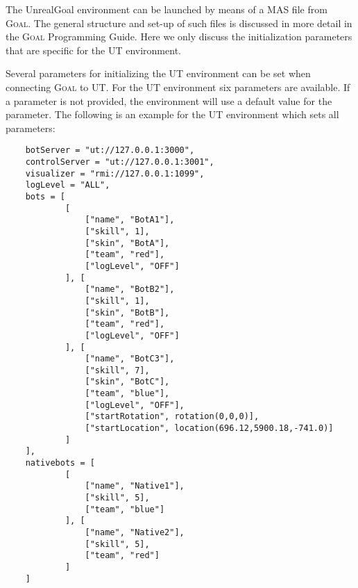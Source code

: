 \documentclass[11pt,a4paper]{article}
\newcommand{\Goal}{\textsc{Goal}}
\begin{document}
The UnrealGoal environment can be launched by means of a MAS file from {\Goal}. The general structure and set-up of such files is discussed in more detail in the {\Goal} Programming Guide. Here we only discuss the initialization parameters that are specific for the UT environment.

Several parameters for initializing the UT environment can be set when connecting {\Goal} to UT. For the UT environment six parameters are available. If a parameter is not provided, the environment will use a default value for the parameter. The following is an example for the UT environment which sets all parameters:

\begin{verbatim}
    botServer = "ut://127.0.0.1:3000",
    controlServer = "ut://127.0.0.1:3001",
    visualizer = "rmi://127.0.0.1:1099",
    logLevel = "ALL", 
    bots = [
            [
                ["name", "BotA1"],
                ["skill", 1],
                ["skin", "BotA"], 
                ["team", "red"],
                ["logLevel", "OFF"]
            ], [
                ["name", "BotB2"],
                ["skill", 1],
                ["skin", "BotB"], 
                ["team", "red"],
                ["logLevel", "OFF"]
            ], [
                ["name", "BotC3"],
                ["skill", 7],
                ["skin", "BotC"], 
                ["team", "blue"],
                ["logLevel", "OFF"],
                ["startRotation", rotation(0,0,0)],
                ["startLocation", location(696.12,5900.18,-741.0)]
            ]
    ],
    nativebots = [
            [
                ["name", "Native1"],
                ["skill", 5],
                ["team", "blue"]	
            ], [
                ["name", "Native2"],
                ["skill", 5],
                ["team", "red"]	
            ]    
    ]
\end{verbatim}
\end{document}
